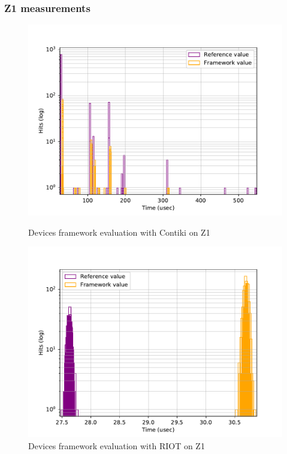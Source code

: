 \subsubsection{Z1 measurements}



\begin{figure}[!ht]
  \begin{minipage}{.45\textwidth}
      \centering
      \includegraphics[scale=.4]{assets/comparison-devices-framework-contiki-z1.pdf}
      \caption{Devices framework evaluation with Contiki on Z1\label{fig:comparison-devices-framework-contiki-z1}}
  \end{minipage}\hfill
  \begin{minipage}{.45\textwidth}        
      \centering
      \includegraphics[scale=.4]{assets/comparison-devices-framework-riot-z1.pdf}
      \caption{Devices framework evaluation with RIOT on Z1\label{fig:comparison-devices-framework-riot-z1}}
  \end{minipage}
\end{figure}
